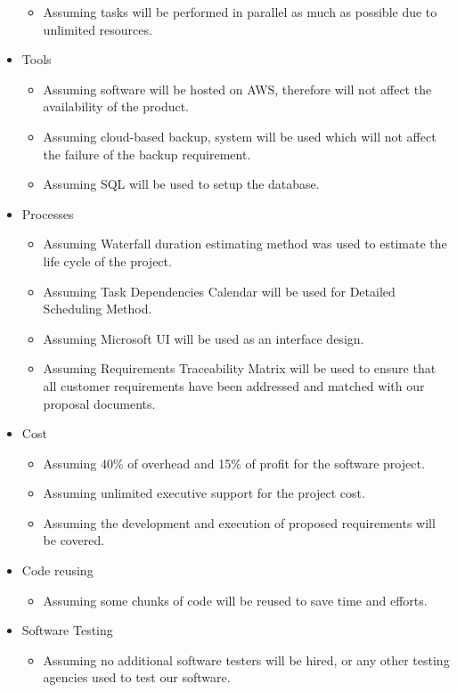 \documentclass{article}
\begin{document}
\begin{itemize}
  \begin{itemize}
  \item Assuming tasks will be performed in parallel as much as possible due to unlimited resources.
  \end{itemize}
\item Tools
  \begin{itemize}
  \item Assuming software will be hosted on AWS, therefore will not affect the availability of the product.
  \item Assuming cloud-based backup, system will be used which will not affect the failure of the backup requirement.
  \item Assuming SQL will be used to setup the database.
  \end{itemize}
\item Processes
  \begin{itemize}
  \item Assuming Waterfall duration estimating method was used to estimate the life cycle of the project.
  \item Assuming Task Dependencies Calendar will be used for Detailed Scheduling Method.
  \item Assuming Microsoft UI will be used as an interface design.
  \item Assuming Requirements Traceability Matrix will be used to ensure that all customer requirements have been addressed and matched with our proposal documents.
  \end{itemize}
\item Cost
  \begin{itemize}
  \item Assuming 40\% of overhead and 15\% of profit for the software project. 
  \item Assuming unlimited executive support for the project cost.
  \item Assuming the development and execution of proposed requirements will be covered.
  \end{itemize}
\item Code reusing
  \begin{itemize}
  \item Assuming some chunks of code will be reused to save time and efforts.
  \end{itemize}
\item Software Testing
  \begin{itemize}
  \item Assuming no additional software testers will be hired, or any other testing agencies used to test our software.

\end{itemize}
\end{itemize}
\end{document}
